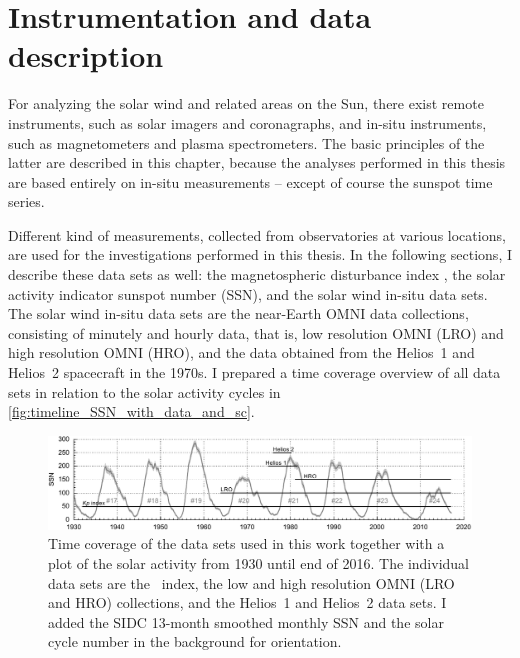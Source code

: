 
\chapter{Instrumentation and data description}
\label{chap:data}
For analyzing the solar wind and related areas on the Sun, there exist remote instruments, such as solar imagers and coronagraphs, and in-situ instruments, such as magnetometers and plasma spectrometers. The basic principles of the latter are described in this chapter, because the analyses performed in this thesis are based entirely on in-situ measurements -- except of course the sunspot time series.

Different kind of measurements, collected from observatories at various locations, are used for the investigations performed in this thesis. In the following sections, I describe these data sets as well: the magnetospheric disturbance index \Kp{}, the solar activity indicator sunspot number (SSN), and the solar wind in-situ data sets. The solar wind in-situ data sets are the near-Earth OMNI data collections, consisting of minutely and hourly data, that is, low resolution OMNI (LRO) and high resolution OMNI (HRO), and the data obtained from the Helios~1 and Helios~2 spacecraft in the 1970s. I prepared a time coverage overview of all data sets in relation to the solar activity cycles in \autoref{fig:timeline_SSN_with_data_and_sc}.
\begin{figure}[htb]
	\centering
	\includegraphics[width=\textwidth]{figures_of_mine/gnuplots/timeline_SSN_with_data_and_sc.pdf}
	\caption[I created the figure myself.]
	{Time coverage of the data sets used in this work together with a plot of the solar activity from 1930 until end of 2016. The individual data sets are the \Kp~index, the low and high resolution OMNI (LRO and HRO) collections, and the Helios~1 and Helios~2 data sets. I added the SIDC 13-month smoothed monthly SSN and the solar cycle number in the background for orientation.}
	\label{fig:timeline_SSN_with_data_and_sc}
\end{figure}


